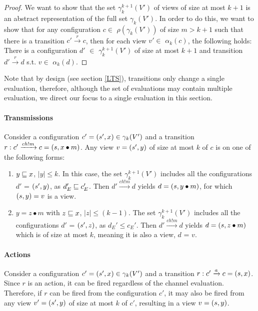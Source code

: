 \begin{proof}
\phantom\qedhere
We want to show that the set $\gamma_k^{k+1}(V')$ of views of size at most $k+1$ is an abstract representation of the full set $\gamma_k(V')$. In order to do this, 
we want to show that for any configuration $c \in$ $\rho(\gamma_k(V'))$ of size $m > k + 1$ such that there is a transition  $c' \xrightarrow{r} c$, then for each view $v' \in$ $\alpha_k(c)$, the following holds: There is a configuration $d'$ $\in$ $\gamma_k^{k+1}(V')$ of size at most $k+1$ and transition $ d' \xrightarrow{r} d$ s.t. $v \in$ $\alpha_k(d)$.
\end{proof}

Note that by design (see section \ref{LTS}), transitions only change a single evaluation, therefore, although the set of evaluations may contain multiple evaluation, we direct our focus to a single evaluation in this section.

\paragraph{Transmissions}
\label{proofTransmission}
Consider a configuration $c' = (s', x) \in \gamma_k(V')$ and a transition $r: c' \xrightarrow{ch!m} c = (s,x \bullet m)$. Any view $v = (s', y)$ of size at most $k$ of $c$ is on one of the following forms:

\begin{enumerate}
\item
$y \sqsubseteq x$, $|y| \leq k$. In this case, the set $\gamma_k^{k+1}(V')$ includes all the configurations $d'$ = $(s', y)$, as $d_E' \sqsubseteq c_E'$. Then $d' \xrightarrow{ch!m} d$ yields $d = (s, y\bullet m)$, for which $(s, y) = v$ is a view.
\item
$y = z\bullet m$ with $z \sqsubseteq x$, $|z| \leq (k-1)$. The set $\gamma_k^{k+1}(V')$ includes all the configurations $d'$ = $(s', z)$, as $d_E' \leq c_E'$. Then $d' \xrightarrow{ch!m} d$ yields $d = (s, z\bullet m)$ which is of size at most $k$, meaning it is also a view, $d$ = $v$.
\end{enumerate}


\paragraph{Actions}
Consider a configuration $c' = (s', x) \in \gamma_k(V')$ and a transition $r: c' \xrightarrow{a} c = (s, x)$. Since $r$ is an action, it can be fired regardless of the channel evaluation. Therefore, if $r$ can be fired from the configuration $c'$, it may also be fired from any view $v' = (s', y)$ of size at most $k$ of $c'$, resulting in a view $v =  (s, y)$.

